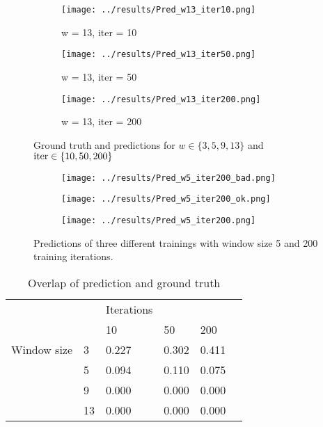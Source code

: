 \documentclass{article}
\begin{document}
\begin{figure}
    \begin{subfigure}[t]{0.3\textwidth}
        \centering
        \texttt{[image: ../results/Pred\_w13\_iter10.png]}
        \caption{w = 13, iter = 10}
    \end{subfigure}
    \begin{subfigure}[t]{0.3\textwidth}
        \centering
        \texttt{[image: ../results/Pred\_w13\_iter50.png]}
        \caption{w = 13, iter = 50}
    \end{subfigure}    
    \begin{subfigure}[t]{0.3\textwidth}
        \centering
        \texttt{[image: ../results/Pred\_w13\_iter200.png]}
        \caption{w = 13, iter = 200}
    \end{subfigure}
    
    \caption{Ground truth and predictions for $w \in \{3,5,9,13\}$ and $\textnormal{iter} \in \{10, 50, 200\}$}

\end{figure}
\begin{figure}
\centering

	\begin{subfigure}[b]{0.3\textwidth}
		\centering    
        \texttt{[image: ../results/Pred\_w5\_iter200\_bad.png]}
    \end{subfigure}
	\begin{subfigure}[b]{0.3\textwidth}
		\centering    
        \texttt{[image: ../results/Pred\_w5\_iter200\_ok.png]}
    \end{subfigure}
	\begin{subfigure}[b]{0.3\textwidth}
		\centering    
        \texttt{[image: ../results/Pred\_w5\_iter200.png]}
    \end{subfigure}
    
    \caption{Predictions of three different trainings with window size 5 and 200 training iterations.}
    
\end{figure}

\begin{table}[b]
  \caption{Overlap of prediction and ground truth}
  \label{overlap}
  \centering
  \begin{tabular}{llllll}
    \toprule
			    & &Iterations &&\\
                &    & 10    & 50    & 200 \\
    \midrule
    Window size & 3  & 0.227 & 0.302 & 0.411 \\
                & 5  & 0.094 & 0.110 & 0.075 \\
                & 9  & 0.000 & 0.000 & 0.000 \\
                & 13 & 0.000 & 0.000 & 0.000 \\
     \bottomrule
  \end{tabular}
\end{table}
\end{document}
